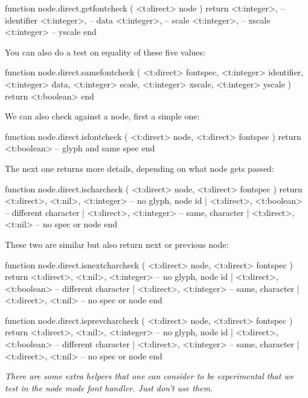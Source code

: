 \starttyping[option=LUA]
function node.direct.getfontcheck (
    <t:direct> node
)
    return
        <t:integer>, -- identifier
        <t:integer>, -- data
        <t:integer>, -- scale
        <t:integer>, -- xscale
        <t:integer>  -- yscale
end
\stoptyping

You can also do a test on equality of these five values:

\starttyping[option=LUA]
function node.direct.samefontcheck (
    <t:direct>  fontspec,
    <t:integer> identifier,
    <t:integer> data,
    <t:integer> scale,
    <t:integer> xscale,
    <t:integer> yscale
)
    return <t:boolean>
end
\stoptyping

We can also check against a node, first a simple one:

\starttyping[option=LUA]
function node.direct.isfontcheck (
    <t:direct> node,
    <t:direct> fontspec
)
    return <t:boolean> -- glyph and same spec
end
\stoptyping

The next one returns more details, depending on what node gets passed:

\starttyping[option=LUA]
function node.direct.ischarcheck (
    <t:direct> node,
    <t:direct> fontspec
)
    return
        <t:direct>, <t:nil>, <t:integer> -- no glyph, node id
      | <t:direct>, <t:boolean>          -- different character
      | <t:direct>, <t:integer>          -- same, character
      | <t:direct>, <t:nil>              -- no spec or node
end
\stoptyping

These two are similar but also return next or previous node:

\starttyping[option=LUA]
function node.direct.isnextcharcheck (
    <t:direct> node,
    <t:direct> fontspec
)
    return
        <t:direct>, <t:nil>, <t:integer> -- no glyph, node id
      | <t:direct>, <t:boolean>          -- different character
      | <t:direct>, <t:integer>          -- same, character
      | <t:direct>, <t:nil>              -- no spec or node
end

function node.direct.isprevcharcheck (
    <t:direct> node,
    <t:direct> fontspec
)
    return
        <t:direct>, <t:nil>, <t:integer> -- no glyph, node id
      | <t:direct>, <t:boolean>          -- different character
      | <t:direct>, <t:integer>          -- same, character
      | <t:direct>, <t:nil>              -- no spec or node
end
\stoptyping

{\em There are some extra helpers that one can consider to be experimental that
we test in the node mode font handler. Just don't use them.}

